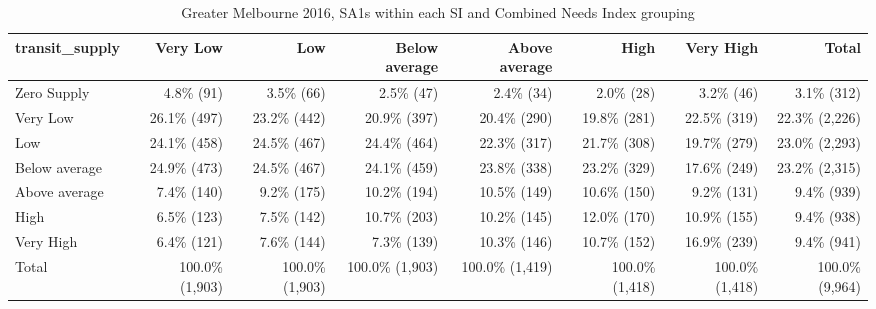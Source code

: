 \documentclass[preprint, 3p,
authoryear]{elsarticle} %
\begin{document}
\begin{table}

\caption{\label{tab:Greater_Melbourne_2016_needs_gap_zones}Greater Melbourne 2016, SA1s within each SI and Combined Needs Index grouping}
\centering
\fontsize{7}{9}\selectfont
\begin{tabular}[t]{l|r|r|r|r|r|r|r}
\hline
transit\_supply & Very Low & Low & Below average & Above average & High & Very High & Total\\
\hline
Zero Supply & 4.8\%    (91) & 3.5\%    (66) & 2.5\%    (47) & 2.4\%    (34) & 2.0\%    (28) & 3.2\%    (46) & 3.1\%   (312)\\
\hline
Very Low & 26.1\%   (497) & 23.2\%   (442) & 20.9\%   (397) & 20.4\%   (290) & 19.8\%   (281) & 22.5\%   (319) & 22.3\% (2,226)\\
\hline
Low & 24.1\%   (458) & 24.5\%   (467) & 24.4\%   (464) & 22.3\%   (317) & 21.7\%   (308) & 19.7\%   (279) & 23.0\% (2,293)\\
\hline
Below average & 24.9\%   (473) & 24.5\%   (467) & 24.1\%   (459) & 23.8\%   (338) & 23.2\%   (329) & 17.6\%   (249) & 23.2\% (2,315)\\
\hline
Above average & 7.4\%   (140) & 9.2\%   (175) & 10.2\%   (194) & 10.5\%   (149) & 10.6\%   (150) & 9.2\%   (131) & 9.4\%   (939)\\
\hline
High & 6.5\%   (123) & 7.5\%   (142) & 10.7\%   (203) & 10.2\%   (145) & 12.0\%   (170) & 10.9\%   (155) & 9.4\%   (938)\\
\hline
Very High & 6.4\%   (121) & 7.6\%   (144) & 7.3\%   (139) & 10.3\%   (146) & 10.7\%   (152) & 16.9\%   (239) & 9.4\%   (941)\\
\hline
Total & 100.0\% (1,903) & 100.0\% (1,903) & 100.0\% (1,903) & 100.0\% (1,419) & 100.0\% (1,418) & 100.0\% (1,418) & 100.0\% (9,964)\\
\hline
\end{tabular}
\end{table}
\end{document}
